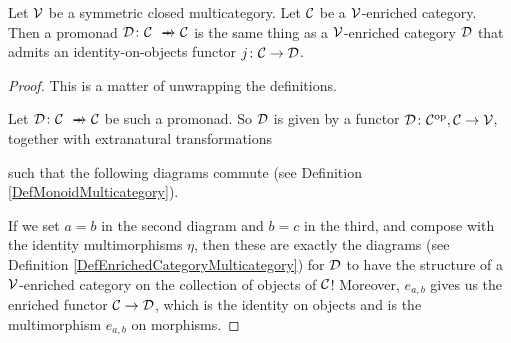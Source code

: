 \documentclass{report}[11pt]
\begin{document}
\begin{proposition}
  \label{PropPromonadsAreCategories}
  Let ${\mathcal{V}}$ be a symmetric closed multicategory.  
  Let ${\mathcal{C}}$ be a ${\mathcal{V}}$-enriched category.  
  Then a promonad $\D\from \C\pto \C$ is the same thing as a ${\mathcal{V}}$-enriched category ${\mathcal{D}}$ that admits an identity-on-objects functor $j\colon {\mathcal{C}} \to {\mathcal{D}}$.
\end{proposition}
\begin{proof}
  This is a matter of unwrapping the definitions.

  Let $\D\from \C \pto \C$ be such a promonad.  
  So ${\mathcal{D}}$ is given by a functor ${\mathcal{D}} \colon {\mathcal{C}}^{\mathrm{op}},{\mathcal{C}} \to {\mathcal{V}}$, together with extranatural transformations
  such that the following diagrams commute (see Definition \ref{DefMonoidMulticategory}).
  If we set $a=b$ in the second diagram and $b=c$ in the third, and compose with the identity multimorphisms $\eta$, then these are exactly the diagrams (see Definition \ref{DefEnrichedCategoryMulticategory}) for ${\mathcal{D}}$ to have the structure of a ${\mathcal{V}}$-enriched category on the collection of objects of ${\mathcal{C}}$!
  Moreover, $e_{a,b}$ gives us the enriched functor ${\mathcal{C}}\to {\mathcal{D}}$, which is the identity on objects and is the multimorphism $e_{a,b}$ on morphisms.


\end{proof}
\end{document}
